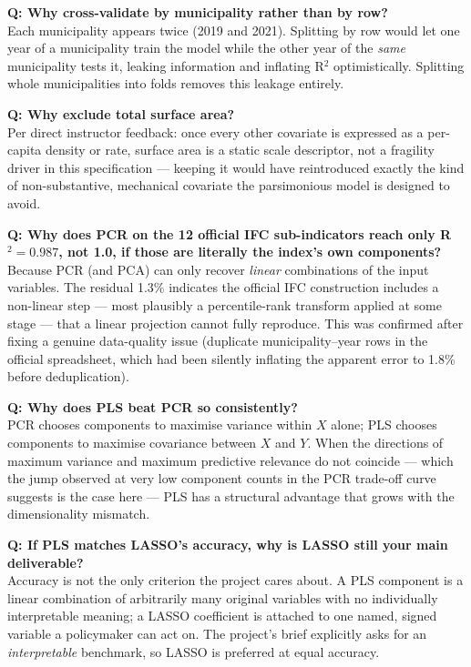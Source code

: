 \documentclass[11pt,a4paper]{article}
\begin{document}
\textbf{Q: Why cross-validate by municipality rather than by row?}\\
Each municipality appears twice (2019 and 2021). Splitting by row
would let one year of a municipality train the model while the
other year of the \emph{same} municipality tests it, leaking
information and inflating R$^2$ optimistically. Splitting whole
municipalities into folds removes this leakage entirely.

\textbf{Q: Why exclude total surface area?}\\
Per direct instructor feedback: once every other covariate is
expressed as a per-capita density or rate, surface area is a static
scale descriptor, not a fragility driver in this specification ---
keeping it would have reintroduced exactly the kind of
non-substantive, mechanical covariate the parsimonious model is
designed to avoid.

\textbf{Q: Why does PCR on the 12 official IFC sub-indicators reach
only R$^2=0.987$, not 1.0, if those are literally the index's own
components?}\\
Because PCR (and PCA) can only recover \emph{linear} combinations of
the input variables. The residual 1.3\% indicates the official IFC
construction includes a non-linear step --- most plausibly a
percentile-rank transform applied at some stage --- that a linear
projection cannot fully reproduce. This was confirmed after fixing a
genuine data-quality issue (duplicate municipality--year rows in the
official spreadsheet, which had been silently inflating the
apparent error to 1.8\% before deduplication).

\textbf{Q: Why does PLS beat PCR so consistently?}\\
PCR chooses components to maximise variance within $X$ alone; PLS
chooses components to maximise covariance between $X$ and $Y$. When
the directions of maximum variance and maximum predictive relevance
do not coincide --- which the jump observed at very low component
counts in the PCR trade-off curve suggests is the case here --- PLS
has a structural advantage that grows with the dimensionality
mismatch.

\textbf{Q: If PLS matches LASSO's accuracy, why is LASSO still your
main deliverable?}\\
Accuracy is not the only criterion the project cares about. A PLS
component is a linear combination of arbitrarily many original
variables with no individually interpretable meaning; a LASSO
coefficient is attached to one named, signed variable a policymaker
can act on. The project's brief explicitly asks for an
\emph{interpretable} benchmark, so LASSO is preferred at equal
accuracy.
\end{document}
